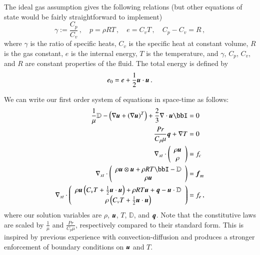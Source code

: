 \documentclass[preprint,12pt]{elsarticle}
\begin{document}
The ideal gas assumption gives the following relations (but other equations of state would be fairly straightforward to implement)
\begin{equation*}
	\gamma:=\frac{C_p}{C_v}\,,\quad p=\rho RT\,,\quad e=C_v T\,,\quad C_p-C_v=R\,,
\end{equation*}
where $\gamma$ is the ratio of specific heats, $C_v$ is the specific heat at constant volume, $R$ is the gas constant,
$e$ is the internal energy, $T$ is the temperature,
and $\gamma$, $C_p$, $C_v$, and $R$ are constant properties of the fluid.
The total energy is defined by
\begin{equation*}
	e_0=e+\frac{1}{2}\boldsymbol u\cdot\boldsymbol u\,.
\end{equation*}

We can write our first order system of equations in space-time as follows:
\begin{subequations}
\label{eq:compressibleNSFirstOrder}
\begin{align}
	\frac{1}{\mu}\mathbb{D}-\LRp{\Grad\bfu+\LRp{\Grad\bfu}^T}+\frac{2}{3}\Div\bfu\bbI&=0\\
	\frac{Pr}{C_p\mu}\bfq+\Grad T&=0\\
	\Divxt\vecttwo{\rho\bfu}{\rho}&=f_c\\
	\Divxt\vecttwo{\rho\bfu\otimes\bfu+\rho RT\bbI-\mathbb{D}}{\rho\bfu}&=\bff_m\\
	\Divxt\vecttwo{\rho\bfu\LRp{C_v T+\frac{1}{2}\bfu\cdot\bfu}+\rho RT\bfu+\bfq-\bfu\cdot\mathbb{D}}{\rho\LRp{C_v T+\frac{1}{2}\bfu\cdot\bfu}}&=f_e\,,
\end{align}
\end{subequations}
where our solution variables are $\rho$, $\boldsymbol u$, $T$, $\mathbb{D}$, and $\boldsymbol q$.
Note that the constitutive laws are scaled by $\frac{1}{\mu}$ and $\frac{Pr}{C_p\mu}$, respectively compared to their standard form.
This is inspired by previous experience with convection-diffusion and produces a stronger enforcement of boundary conditions on
$\boldsymbol u$ and $T$.


%                                                                                           
%                                                                                           
%              
\end{document}
